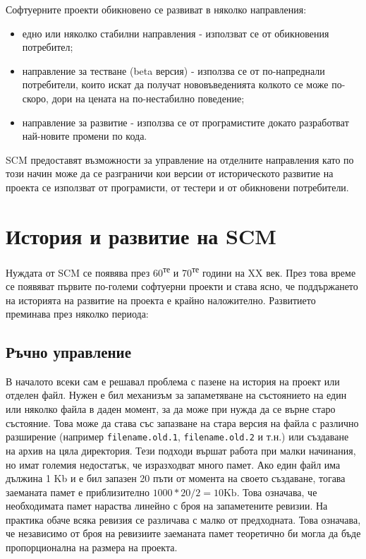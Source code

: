 \documentclass[a4paper]{article}
\begin{document}
Софтуерните проекти обикновено се развиват в няколко направления:
\begin{itemize}
  \item едно или няколко стабилни направления - използват се от обикновения
  потребител;
  \item направление за тестване (beta версия) - използва се от по-напреднали
  потребители, които искат да получат нововъведенията колкото се може по-скоро,
  дори на цената на по-нестабилно поведение;
  \item направление за развитие - използва се от програмистите докато
  разработват най-новите промени по кода.
\end{itemize}


SCM предоставят възможности за управление на отделните направления като по
този начин може да се разграничи кои версии от историческото развитие на 
проекта се използват от програмисти, от тестери и от обикновени потребители.

\section{История и развитие на SCM}
Нуждата от SCM се появява през 60\textsuperscript{те} и
70\textsuperscript{те} години на XX век. През
това време се появяват първите по-големи софтуерни проекти и става ясно, че
поддържането на историята на развитие на проекта е крайно наложително.
Развитието преминава през няколко периода:
  \subsection{Ръчно управление}
  В началото всеки сам е решавал проблема с пазене на история на проект или
  отделен файл. Нужен е бил механизъм за запаметяване на състоянието на един
  или няколко файла в даден момент, за да може при нужда да се върне старо
  състояние. Това може да става със запазване на стара версия на файла с
  различно разширение (например \texttt{filename.old.1},
  \texttt{filename.old.2} и т.н.) или създаване на архив на цяла директория.
  Тези подходи вършат работа при малки начинания, но имат големия недостатък, че
  изразходват много памет. Ако един файл има дължина 1 Kb и е бил запазен 20
  пъти от момента на своето създаване, тогава заеманата памет е приблизително
  $1000 * 20 / 2 = 10 \mathrm{Kb}$. Това означава, че необходимата памет нараства
  линейно с броя на запаметените ревизии. На практика обаче всяка
  ревизия се различава с малко от предходната. Това означава, че независимо от
  броя на ревизиите заеманата памет теоретично би могла да бъде пропорционална 
  на размера на проекта.
\end{document}
